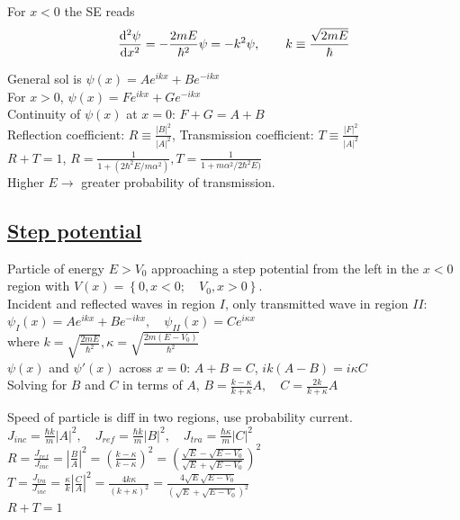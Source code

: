 For $x < 0$ the SE reads $$\dv[2]{\psi}{x} = -\frac{2mE}{\hbar^2} \psi = -k^2 \psi, \qquad k \equiv \frac{\sqrt{2mE}}{\hbar}$$

General sol is $\psi(x) = Ae^{ikx} + Be^{-ikx}$ \\
For $x > 0$, $\psi(x) = Fe^{ikx} + Ge^{-ikx}$ \\

Continuity of $\psi(x)$ at $x = 0$: $F+G=A+B$ \\

Reflection coefficient: $R \equiv \frac{|B|^2}{|A|^2}$, 
Transmission coefficient: $T \equiv \frac{|F|^2}{|A|^2}$ \\
$R + T = 1$, $R = \frac{1}{1+(2\hbar^2E/m \alpha^2)}, T = \frac{1}{1+m \alpha^2 / 2 \hbar^2 E)}$ \\
Higher $E \rightarrow$ greater probability of transmission.

\subsection{\underline{Step potential}}
Particle of energy $E > V_0$ approaching a step potential from the left in the $x < 0$ region with $V(x) = \left\{ 0, x < 0; \quad V_0, x > 0 \right\}.$ \\

Incident and reflected waves in region $I$, only transmitted wave in region $II$:
$\psi_{I}(x) = Ae^{ikx} + Be^{-ikx}, \quad \psi_{II}(x) = Ce^{i\kappa x}$ \\
where $k = \sqrt{\frac{2mE}{\hbar^2}}, \kappa = \sqrt{\frac{2m(E - V_0)}{\hbar^2}}$ \\

$\psi(x)$ and $\psi'(x)$ across $x = 0$: $A+B=C$, $ik(A-B) = i \kappa C$ \\
Solving for $B$ and $C$ in terms of $A$, $B= \frac{k - \kappa}{k + \kappa} A, \quad C = \frac{2k}{k + \kappa} A$

Speed of particle is diff in two regions, use probability current. \\
$J_{inc} = \frac{\hbar k}{m} |A|^2, \quad J_{ref} = \frac{\hbar k}{m} |B|^2, \quad J_{tra} = \frac{\hbar \kappa}{m} |C|^2$ \\

$R = \frac{J_{ref}}{J_{inc}} = |\frac{B}{A}|^2 = (\frac{k - \kappa}{k - \kappa})^2 = (\frac{\sqrt{E} - \sqrt{E - V_0}}{\sqrt{E} + \sqrt{E - V_0}})^2$ \\
$T = \frac{J_{tra}}{J_{inc}} = \frac{\kappa}{k} |\frac{C}{A}|^2 = \frac{4k \kappa}{(k+\kappa)^2} = \frac{4 \sqrt{E} \sqrt{E - V_0}}{(\sqrt{E} + \sqrt{E - V_0})^2}$ \\
$R + T = 1$

